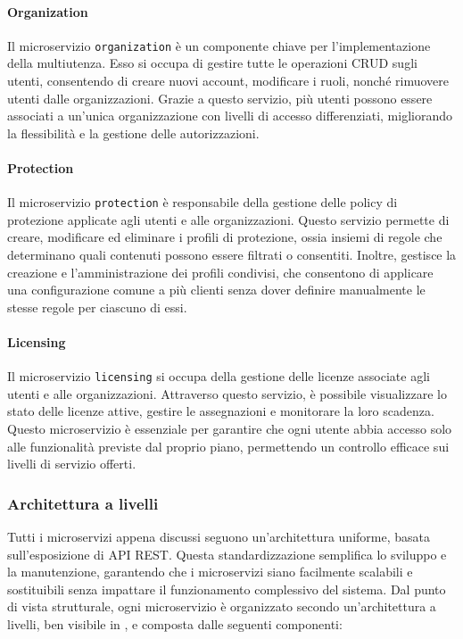 \paragraph{Organization}
Il microservizio \texttt{organization} è un componente chiave per l'implementazione della multiutenza. Esso si occupa di gestire tutte le operazioni CRUD sugli utenti, consentendo di creare nuovi account, modificare i ruoli, nonché rimuovere utenti dalle organizzazioni.
Grazie a questo servizio, più utenti possono essere associati a un'unica organizzazione con livelli di accesso differenziati, migliorando la flessibilità e la gestione delle autorizzazioni.

\paragraph{Protection}
Il microservizio \texttt{protection} è responsabile della gestione delle policy di protezione applicate agli utenti e alle organizzazioni. Questo servizio permette di creare, modificare ed eliminare i profili di protezione, ossia insiemi di regole che determinano quali contenuti possono essere filtrati o consentiti.
Inoltre, gestisce la creazione e l’amministrazione dei profili condivisi, che consentono di applicare una configurazione comune a più clienti senza dover definire manualmente le stesse regole per ciascuno di essi.

\paragraph{Licensing}
Il microservizio \texttt{licensing} si occupa della gestione delle licenze associate agli utenti e alle organizzazioni. Attraverso questo servizio, è possibile visualizzare lo stato delle licenze attive, gestire le assegnazioni e monitorare la loro scadenza.
Questo microservizio è essenziale per garantire che ogni utente abbia accesso solo alle funzionalità previste dal proprio piano, permettendo un controllo efficace sui livelli di servizio offerti.

\subsubsection{Architettura a livelli}
Tutti i microservizi appena discussi seguono un'architettura uniforme, basata sull'esposizione di API REST. Questa standardizzazione semplifica lo sviluppo e la manutenzione, garantendo che i microservizi siano facilmente scalabili e sostituibili senza impattare il funzionamento complessivo del sistema. Dal punto di vista strutturale, ogni microservizio è organizzato secondo un'architettura a livelli, ben visibile in , e composta dalle seguenti componenti:

